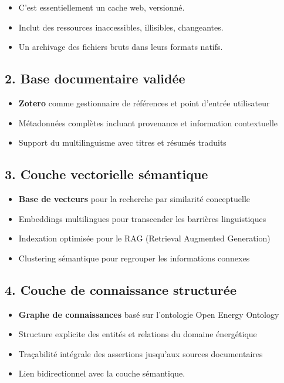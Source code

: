 \documentclass[a4paper,11pt]{report}
\providecommand{\tightlist}{\setlength{\itemsep}{0pt}\setlength{\parskip}{0pt}}
\begin{document}
\begin{itemize}
\tightlist
\item
  C'est essentiellement un cache web, versionné.
\item
  Inclut des ressources inaccessibles, illisibles, changeantes.
\item
  Un archivage des fichiers bruts dans leurs formats natifs.
\end{itemize}

\subsection{2. Base documentaire validée}\label{base-documentaire-validuxe9e}

\begin{itemize}
\tightlist
\item
  \textbf{Zotero} comme gestionnaire de références et point d'entrée utilisateur
\item
  Métadonnées complètes incluant provenance et information contextuelle
\item
  Support du multilinguisme avec titres et résumés traduits
\end{itemize}

\subsection{3. Couche vectorielle sémantique}\label{couche-vectorielle-suxe9mantique}

\begin{itemize}
\tightlist
\item
  \textbf{Base de vecteurs} pour la recherche par similarité conceptuelle
\item
  Embeddings multilingues pour transcender les barrières linguistiques
\item
  Indexation optimisée pour le RAG (Retrieval Augmented Generation)
\item
  Clustering sémantique pour regrouper les informations connexes
\end{itemize}

\subsection{4. Couche de connaissance structurée}\label{couche-de-connaissance-structuruxe9e}

\begin{itemize}
\tightlist
\item
  \textbf{Graphe de connaissances} basé sur l'ontologie Open Energy Ontology
\item
  Structure explicite des entités et relations du domaine énergétique
\item
  Traçabilité intégrale des assertions jusqu'aux sources documentaires
\item
  Lien bidirectionnel avec la couche sémantique.
\end{itemize}
\end{document}
